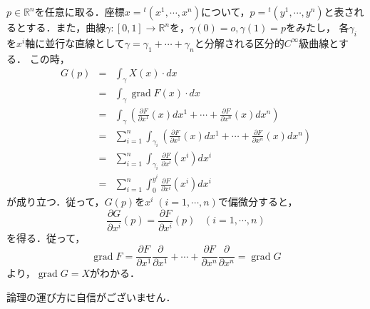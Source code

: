 \documentclass[dvipdfmx,uplatex]{jsarticle}
\DeclareMathOperator{\grad}{\mathrm{grad}}
\theoremstyle{definition}
\theoremstyle{StatementsWithStar}
\theoremstyle{StatementsWithStar2}
\theoremstyle{StatementsWithStar3}
\theoremstyle{StatementsWithCCirc}
\theoremstyle{definition}
\begin{document}
$p\in\mathbb{R}^n$を任意に取る．座標$x={}^t(x^1,\cdots,x^n)$について，$p={}^t(y^1,\cdots,y^n)$と表されるとする．また，曲線$\gamma:[0,1]\to\mathbb{R}^n$を，$\gamma(0)=o,\gamma(1)=p$をみたし，
各$\gamma_i$を$x^i$軸に並行な直線として$\gamma=\gamma_1+\cdots+\gamma_n$と分解される区分的$C^\infty$級曲線とする．
この時，
\begin{eqnarray*}
    G(p) &=& \int_\gamma X(x)\cdot dx \\
    &=& \int_\gamma \grad F(x)\cdot dx \\
    &=& \int_\gamma \left( \frac{\partial F}{\partial x^1}(x)dx^1+\cdots+\frac{\partial F}{\partial x^n}(x)dx^n \right) \\
    &=& \sum^n_{i=1}\int_{\gamma_i}\left( \frac{\partial F}{\partial x^1}(x)dx^1+\cdots+\frac{\partial F}{\partial x^n}(x)dx^n \right)\\
    &=& \sum^n_{i=1}\int_{\gamma_i} \frac{\partial F}{\partial x^i}(x^i)dx^i \\
    &=& \sum^n_{i=1}\int^{y^i}_0 \frac{\partial F}{\partial x^i}(x^i)dx^i
\end{eqnarray*}
が成り立つ．従って，$G(p)$を$x^i\; (i=1,\cdots,n)$で偏微分すると，
\[ \frac{\partial G}{\partial x^i}(p)=\frac{\partial F}{\partial x^i}(p) \;\;\; (i=1,\cdots,n) \]
を得る．従って，
\[ \grad F=\frac{\partial F}{\partial x^1}\frac{\partial}{\partial x^1}+\cdots +\frac{\partial F}{\partial x^n}\frac{\partial}{\partial x^n}=\grad G \]
より，$\grad G=X$がわかる．

\vspace{3cm}

論理の運び方に自信がございません．
\end{document}

